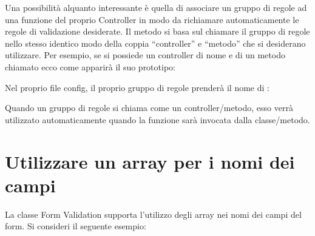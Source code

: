 Una possibilità alquanto interessante è quella di associare un gruppo di regole ad una funzione del proprio Controller in modo da richiamare automaticamente le regole di validazione desiderate. Il metodo si basa sul chiamare il gruppo di regole nello stesso identico modo della coppia ``controller'' e ``metodo'' che si desiderano utilizzare. Per esempio, se si possiede un controller di nome  e di un metodo chiamato  ecco come apparirà il suo prototipo:


Nel proprio file config, il proprio gruppo di regole prenderà il nome di :


Quando un gruppo di regole si chiama come un controller/metodo, esso verrà utilizzato automaticamente quando la funzione  sarà invocata dalla classe/metodo.

\section*{Utilizzare un array per i nomi dei campi}
La classe Form Validation supporta l'utilizzo degli array nei nomi dei campi del form. Si consideri il seguente esempio:

